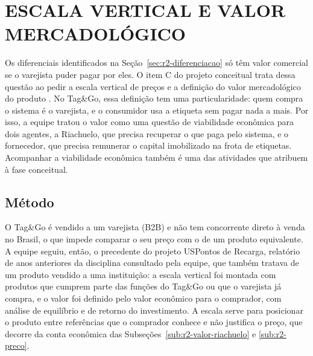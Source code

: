 
\section{ESCALA VERTICAL E VALOR MERCADOLÓGICO}
\label{sec:r2-valor}

Os diferenciais identificados na Seção~\ref{sec:r2-diferenciacao} só têm valor comercial se o varejista puder pagar por eles. O item C do projeto conceitual trata dessa questão ao pedir a escala vertical de preços e a definição do valor mercadológico do produto \cite{zancul2026conceitual}. No Tag\&Go, essa definição tem uma particularidade: quem compra o sistema é o varejista, e o consumidor usa a etiqueta sem pagar nada a mais. Por isso, a equipe tratou o valor como uma questão de viabilidade econômica para dois agentes, a Riachuelo, que precisa recuperar o que paga pelo sistema, e o fornecedor, que precisa remunerar o capital imobilizado na frota de etiquetas. Acompanhar a viabilidade econômica também é uma das atividades que  atribuem à fase conceitual.

\subsection{Método}
\label{sub:r2-valor-metodo}

O Tag\&Go é vendido a um varejista (B2B) e não tem concorrente direto à venda no Brasil, o que impede comparar o seu preço com o de um produto equivalente. A equipe seguiu, então, o precedente do projeto USPontos de Recarga, relatório de anos anteriores da disciplina consultado pela equipe, que também tratava de um produto vendido a uma instituição: a escala vertical foi montada com produtos que cumprem parte das funções do Tag\&Go ou que o varejista já compra, e o valor foi definido pelo valor econômico para o comprador, com análise de equilíbrio e de retorno do investimento. A escala serve para posicionar o produto entre referências que o comprador conhece e não justifica o preço, que decorre da conta econômica das Subseções~\ref{sub:r2-valor-riachuelo} e \ref{sub:r2-preco}.

